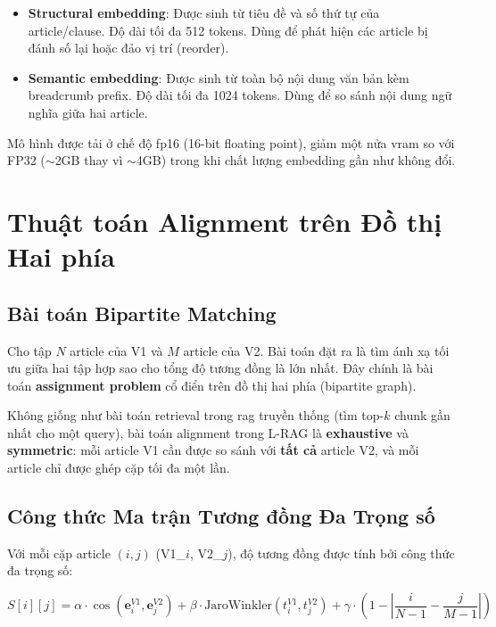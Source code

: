 \begin{itemize}
    \item \textbf{Structural embedding}: Được sinh từ tiêu đề và số thứ tự của article/clause. Độ dài tối đa 512 tokens. Dùng để phát hiện các article bị đánh số lại hoặc đảo vị trí (reorder).
    \item \textbf{Semantic embedding}: Được sinh từ toàn bộ nội dung văn bản kèm breadcrumb prefix. Độ dài tối đa 1024 tokens. Dùng để so sánh nội dung ngữ nghĩa giữa hai article.
\end{itemize}

Mô hình được tải ở chế độ \gls{fp16} (16-bit floating point), giảm một nửa \gls{vram} so với FP32 ($\sim$2GB thay vì $\sim$4GB) trong khi chất lượng embedding gần như không đổi.

\section{Thuật toán Alignment trên Đồ thị Hai phía}

\subsection{Bài toán Bipartite Matching}

Cho tập $N$ article của V1 và $M$ article của V2. Bài toán đặt ra là tìm ánh xạ tối ưu giữa hai tập hợp sao cho tổng độ tương đồng là lớn nhất. Đây chính là bài toán \textbf{assignment problem} cổ điển trên đồ thị hai phía (bipartite graph).

Không giống như bài toán retrieval trong \gls{rag} truyền thống (tìm top-$k$ chunk gần nhất cho một query), bài toán alignment trong L-RAG là \textbf{exhaustive} và \textbf{symmetric}: mỗi article V1 cần được so sánh với \textbf{tất cả} article V2, và mỗi article chỉ được ghép cặp tối đa một lần.

\subsection{Công thức Ma trận Tương đồng Đa Trọng số}

Với mỗi cặp article $(i, j)$ (V1\_$i$, V2\_$j$), độ tương đồng được tính bởi công thức đa trọng số:

\begin{equation}
    S[i][j] = \alpha \cdot \cos(\mathbf{e}_i^{V1}, \mathbf{e}_j^{V2})
            + \beta \cdot \text{JaroWinkler}(t_i^{V1}, t_j^{V2})
            + \gamma \cdot \left(1 - \left|\frac{i}{N-1} - \frac{j}{M-1}\right|\right)
    \label{eq:similarity}
\end{equation}

